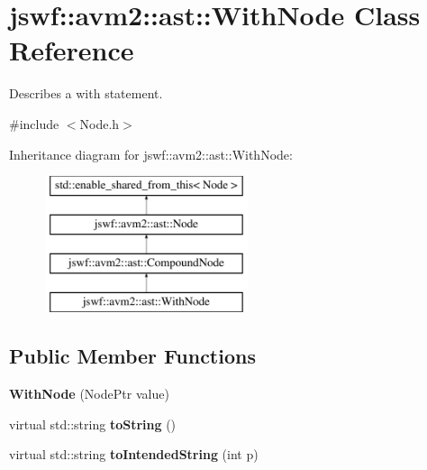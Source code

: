\hypertarget{classjswf_1_1avm2_1_1ast_1_1_with_node}{\section{jswf\+:\+:avm2\+:\+:ast\+:\+:With\+Node Class Reference}
\label{classjswf_1_1avm2_1_1ast_1_1_with_node}
}


Describes a {\ttfamily with} statement.  




{\ttfamily \#include $<$Node.\+h$>$}

Inheritance diagram for jswf\+:\+:avm2\+:\+:ast\+:\+:With\+Node\+:\begin{figure}[H]
\begin{center}
\leavevmode
\includegraphics[height=4.000000cm]{classjswf_1_1avm2_1_1ast_1_1_with_node}
\end{center}
\end{figure}
\subsection*{Public Member Functions}
\begin{DoxyCompactItemize}
\item 
\hypertarget{classjswf_1_1avm2_1_1ast_1_1_with_node_a5a95befed75780a7c11103394efc5e3a}{{\bfseries With\+Node} (Node\+Ptr value)}\label{classjswf_1_1avm2_1_1ast_1_1_with_node_a5a95befed75780a7c11103394efc5e3a}

\item 
\hypertarget{classjswf_1_1avm2_1_1ast_1_1_with_node_ac61c828074a617defaf8ef677f3507f5}{virtual std\+::string {\bfseries to\+String} ()}\label{classjswf_1_1avm2_1_1ast_1_1_with_node_ac61c828074a617defaf8ef677f3507f5}

\item 
\hypertarget{classjswf_1_1avm2_1_1ast_1_1_with_node_ae324b9157d35a834a98e54d92aa1d6b4}{virtual std\+::string {\bfseries to\+Intended\+String} (int p)}\label{classjswf_1_1avm2_1_1ast_1_1_with_node_ae324b9157d35a834a98e54d92aa1d6b4}

\end{DoxyCompactItemize}
